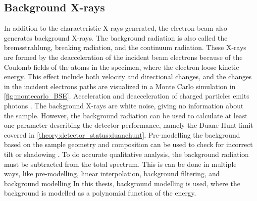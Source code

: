 








\subsection{Background X-rays}
\label{theory:xray_formation:background}


In addition to the characteristic X-rays generated, the electron beam also generates background X-rays.
The background radiation is also called the bremsstrahlung, breaking radiation, and the continuum radiation.
These X-rays are formed by the deacceleration of the incident beam electrons because of the Coulomb fields of the atoms in the specimen, where the electron loose kinetic energy.
This effect include both velocity and directional changes, and the changes in the incident electrons paths are visualized in a Monte Carlo simulation in \cref{fig:montecarlo_BSE}.
Acceleration and deacceleration of charged particles emits photons \cite{notaros_electromagnetics_2010}.
The background X-rays are white noise, giving no information about the sample.
However, the background radiation can be used to calculate at least one parameter describing the detector performance, namely the Duane-Hunt limit covered in \cref{theory:detector_status:duanehunt}.
Pre-modelling the background based on the sample geometry and composition can be used to check for incorrect tilt or shadowing \cite{edax_insight_2019}.
To do accurate qualitative analysis, the background radiation must be subtracted from the total spectrum.
This is can be done in multiple ways, like pre-modelling, linear interpolation, background filtering, and background modelling \cite{liao2006practical}
In this thesis, background modelling is used, where the background is modelled as a polynomial function of the energy.




